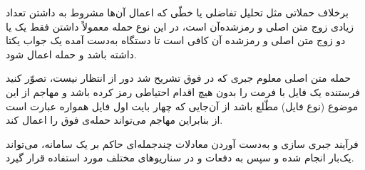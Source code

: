 برخلاف حملاتی مثل تحلیل تفاضلی یا خطّی که اعمال آن‌ها مشروط به داشتن تعداد زیادی زوج متن اصلی و رمزشده‌آن است، در این نوع حمله‌ معمولاً داشتن فقط یک یا دو زوج متن اصلی و رمزشده آن کافی است تا دستگاه به‌دست آمده یک جواب یکتا داشته باشد و حمله اعمال شود. 

\begin{remark}
	حمله‌  متن اصلی معلوم جبری که در فوق تشریح شد دور از انتظار نیست، تصوّر کنید فرستنده یک فایل با فرمت 
	را بدون هیچ اقدام احتیاطی رمز کرده باشد و مهاجم از این موضوع (نوع فایل)
	مطّلع باشد از آن‌جایی که چهار بایت اول فایل 
	همواره عبارت است از
	بنابراین مهاجم می‌تواند حمله‌ی فوق را اعمال کند. 
\end{remark}

\begin{remark}
فرآیند جبری سازی و به‌دست آوردن معادلات چندجمله‌ای حاکم بر یک سامانه، می‌تواند یک‌بار انجام شده و سپس به دفعات و در سناریو‌های مختلف مورد استفاده قرار گیرد.
\end{remark}

